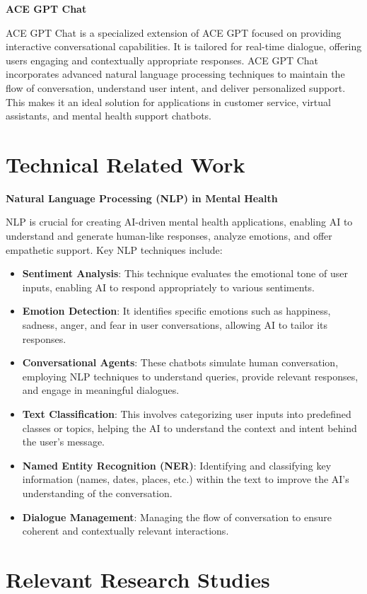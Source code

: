 \textbf{ACE GPT Chat}

ACE GPT Chat is a specialized extension of ACE GPT focused on providing interactive conversational capabilities. It is tailored for real-time dialogue, offering users engaging and contextually appropriate responses. ACE GPT Chat incorporates advanced natural language processing techniques to maintain the flow of conversation, understand user intent, and deliver personalized support. This makes it an ideal solution for applications in customer service, virtual assistants, and mental health support chatbots.

\section{Technical Related Work}
\textbf{Natural Language Processing (NLP) in Mental Health}

NLP is crucial for creating AI-driven mental health applications, enabling AI to understand and generate human-like responses, analyze emotions, and offer empathetic support. Key NLP techniques include:

\begin{itemize}
    \item \textbf{Sentiment Analysis}: This technique evaluates the emotional tone of user inputs, enabling AI to respond appropriately to various sentiments.
    \item \textbf{Emotion Detection}: It identifies specific emotions such as happiness, sadness, anger, and fear in user conversations, allowing AI to tailor its responses.
    \item \textbf{Conversational Agents}: These chatbots simulate human conversation, employing NLP techniques to understand queries, provide relevant responses, and engage in meaningful dialogues.
    \item \textbf{Text Classification}: This involves categorizing user inputs into predefined classes or topics, helping the AI to understand the context and intent behind the user's message.
    \item \textbf{Named Entity Recognition (NER)}: Identifying and classifying key information (names, dates, places, etc.) within the text to improve the AI's understanding of the conversation.
    \item \textbf{Dialogue Management}: Managing the flow of conversation to ensure coherent and contextually relevant interactions.
\end{itemize}

\section{Relevant Research Studies}

